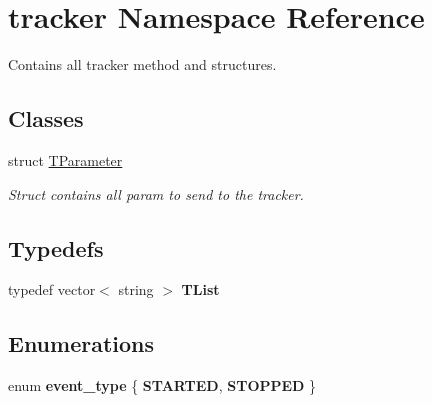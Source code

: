 \hypertarget{namespacetracker}{}\section{tracker Namespace Reference}
\label{namespacetracker}


Contains all tracker method and structures.  


\subsection*{Classes}
\begin{DoxyCompactItemize}
\item 
struct \hyperlink{structtracker_1_1TParameter}{T\+Parameter}
\begin{DoxyCompactList}\small\item\em Struct contains all param to send to the tracker. \end{DoxyCompactList}\end{DoxyCompactItemize}
\subsection*{Typedefs}
\begin{DoxyCompactItemize}
\item 
\mbox{\label{namespacetracker_a5c98069e9e5f8fbee2ac2ee82144347d}} 
typedef vector$<$ string $>$ {\bfseries T\+List}
\end{DoxyCompactItemize}
\subsection*{Enumerations}
\begin{DoxyCompactItemize}
\item 
\mbox{\label{namespacetracker_adad29535063afb92161f98de28f9af30}} 
enum {\bfseries event\+\_\+type} \{ {\bfseries S\+T\+A\+R\+T\+ED}, 
{\bfseries S\+T\+O\+P\+P\+ED}
 \}
\end{DoxyCompactItemize}

